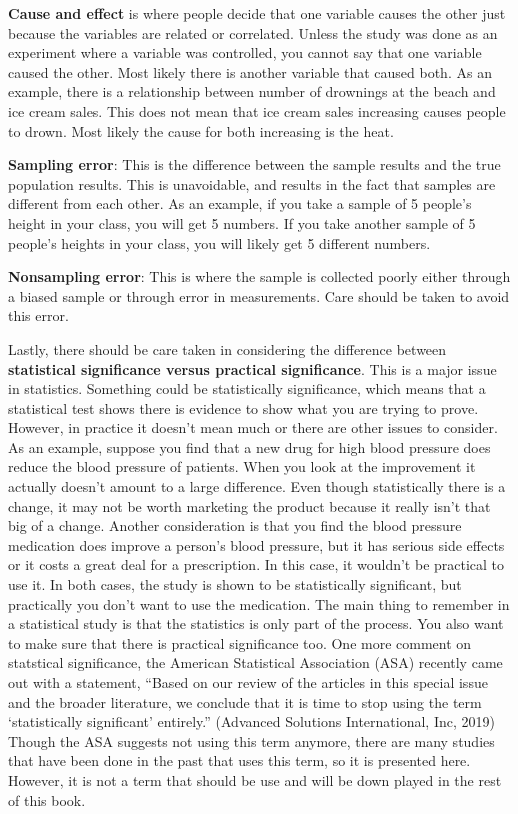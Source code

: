 \documentclass[]{book}
\begin{document}
\textbf{Cause and effect} is where people decide that one variable causes the other just because the variables are related or correlated. Unless the study was done as an experiment where a variable was controlled, you cannot say that one variable caused the other. Most likely there is another variable that caused both. As an example, there is a relationship between number of drownings at the beach and ice cream sales. This does not mean that ice cream sales increasing causes people to drown. Most likely the cause for both increasing is the heat.

\textbf{Sampling error}: This is the difference between the sample results and the true population results. This is unavoidable, and results in the fact that samples are different from each other. As an example, if you take a sample of 5 people's height in your class, you will get 5 numbers. If you take another sample of 5 people's heights in your class, you will likely get 5 different numbers.

\textbf{Nonsampling error}: This is where the sample is collected poorly either through a biased sample or through error in measurements. Care should be taken to avoid this error.

Lastly, there should be care taken in considering the difference between \textbf{statistical significance versus practical significance}. This is a major issue in statistics. Something could be statistically significance, which means that a statistical test shows there is evidence to show what you are trying to prove. However, in practice it doesn't mean much or there are other issues to consider. As an example, suppose you find that a new drug for high blood pressure does reduce the blood pressure of patients. When you look at the improvement it actually doesn't amount to a large difference. Even though statistically there is a change, it may not be worth marketing the product because it really isn't that big of a change. Another consideration is that you find the blood pressure medication does improve a person's blood pressure, but it has serious side effects or it costs a great deal for a prescription. In this case, it wouldn't be practical to use it. In both cases, the study is shown to be statistically significant, but practically you don't want to use the medication. The main thing to remember in a statistical study is that the statistics is only part of the process. You also want to make sure that there is practical significance too. One more comment on statstical significance, the American Statistical Association (ASA) recently came out with a statement, ``Based on our review of the articles in this special issue and the broader literature, we conclude that it is time to stop using the term `statistically significant' entirely.'' (Advanced Solutions International, Inc, 2019) Though the ASA suggests not using this term anymore, there are many studies that have been done in the past that uses this term, so it is presented here. However, it is not a term that should be use and will be down played in the rest of this book.
\end{document}
